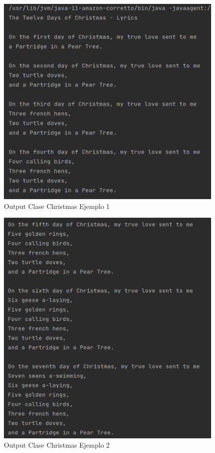 \documentclass{article}
\begin{document}
\begin{figure}[H]
	\centering
	\includegraphics[scale = 0.8]{images/xmas1.png}
	\caption{Output Clase Christmas Ejemplo 1}
\end{figure}

\begin{figure}[H]
	\centering
	\includegraphics[scale = 0.8]{images/xmas2.png}
	\caption{Output Clase Christmas Ejemplo 2}
\end{figure}
\end{document}
